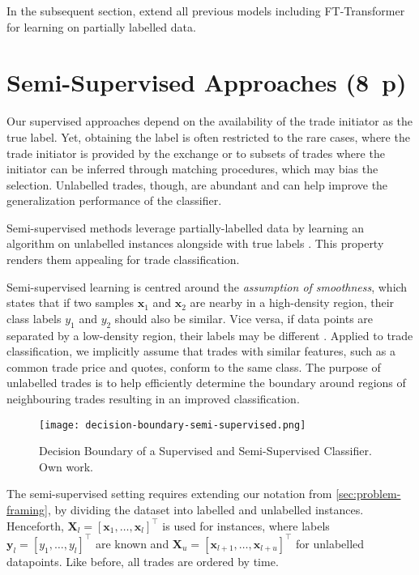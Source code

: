 In the subsequent section, extend all previous models including FT-Transformer for learning on partially labelled data.

\newpage
\section{Semi-Supervised Approaches (8~p)}\label{sec:semi-supervised-approaches}

Our supervised approaches depend on the availability of the trade initiator as the true label. Yet, obtaining the label is often restricted to the rare cases, where the trade initiator is provided by the exchange or to subsets of trades where the initiator can be inferred through matching procedures, which may bias the selection. Unlabelled trades, though, are abundant and can help improve the generalization performance of the classifier.

Semi-supervised methods leverage partially-labelled data by learning an algorithm on unlabelled instances alongside with true labels \autocite[][6]{chapelleSemisupervisedLearning2006}. This property renders them appealing for trade classification.

Semi-supervised learning is centred around the \emph{assumption of smoothness}, which states that if two samples $\mathbf{x}_{1}$ and $\mathbf{x}_{2}$ are nearby in a high-density region, their class labels $y_{1}$ and $y_{2}$ should also be similar. Vice versa, if data points are separated by a low-density region, their labels may be different \autocite[][5]{chapelleSemisupervisedLearning2006}. Applied to trade classification, we implicitly assume that trades with similar features, such as a common trade price and quotes, conform to the same class. The purpose of unlabelled trades is to help efficiently determine the boundary around regions of neighbouring trades resulting in an improved classification.

\begin{figure}[h]
    \centering
    \texttt{[image: decision-boundary-semi-supervised.png]}
    \caption[Decision Boundary of a Supervised and Semi-Supervised Classifier]{Decision Boundary of a Supervised and Semi-Supervised Classifier. Own work.}
    \label{fig:supervised-semi-supervised}
\end{figure}

The semi-supervised setting requires extending our notation from \cref{sec:problem-framing}, by dividing the dataset into labelled and unlabelled instances. Henceforth, $\mathbf{X}_{l} = \left[\mathbf{x}_{1},\ldots, \mathbf{x}_{l}\right]^{\top}$ is used for instances, where labels $\mathbf{y}_{l} = \left[y_{1},\ldots, y_{l}\right]^{\top}$ are known and $\mathbf{X}_{u} = \left[\mathbf{x}_{l+1},\ldots, \mathbf{x}_{l+u}\right]^{\top}$ for unlabelled datapoints. Like before, all trades are ordered by time.

